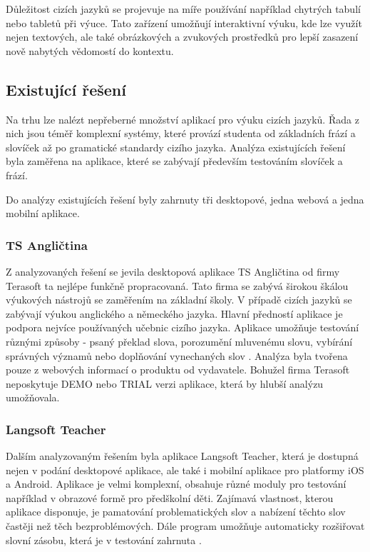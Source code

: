 \documentclass[a4paper,11pt,titlepage,fleqn]{article}
\begin{document}
            Důležitost cizích jazyků se projevuje na míře používání například chytrých tabulí nebo tabletů při výuce. Tato zařízení umožňují interaktivní výuku, kde lze využít nejen textových, ale také obrázkových a zvukových prostředků pro lepší zasazení nově nabytých vědomostí do kontextu. 


    \subsection{Existující řešení}
        Na trhu lze nalézt nepřeberné množství aplikací pro výuku cizích jazyků. Řada z nich jsou téměř komplexní systémy, které provází studenta od základních frází a slovíček až po gramatické standardy cizího jazyka. Analýza existujících řešení byla zaměřena na aplikace, které se zabývají především testováním slovíček a frází.

        Do analýzy existujících řešení byly zahrnuty tři desktopové, jedna webová a jedna mobilní aplikace.

        \subsubsection{TS Angličtina}
            Z analyzovaných řešení se jevila desktopová aplikace TS Angličtina od firmy Terasoft ta nejlépe funkčně propracovaná. Tato firma se zabývá širokou škálou výukových nástrojů se zaměřením na základní školy. V případě cizích jazyků se zabývají výukou anglického a německého jazyka. Hlavní předností aplikace je podpora nejvíce používaných učebnic cizího jazyka. Aplikace umožňuje testování různými způsoby - psaný překlad slova, porozumění mluvenému slovu, vybírání správných významů nebo doplňování vynechaných slov \cite{bib:terasoft}. Analýza byla tvořena pouze z webových informací o produktu od vydavatele. Bohužel firma Terasoft neposkytuje DEMO nebo TRIAL verzi aplikace, která by hlubší analýzu umožňovala.

        \subsubsection{Langsoft Teacher}
            Dalším analyzovaným řešením byla aplikace Langsoft Teacher, která je dostupná nejen v podání desktopové aplikace, ale také i mobilní aplikace pro platformy iOS a Android. Aplikace je velmi komplexní, obsahuje různé moduly pro testování například v obrazové formě pro předškolní děti. Zajímavá vlastnost, kterou aplikace disponuje, je pamatování problematických slov a nabízení těchto slov častěji než těch bezproblémových. Dále program umožňuje automaticky rozšiřovat slovní zásobu, která je v testování zahrnuta \cite{bib:langsoft}.
\end{document}

